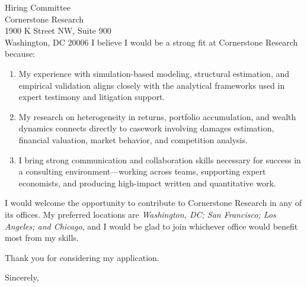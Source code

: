 \documentclass[11pt,letterpaper]{letter}
\begin{document}
\begin{letter}{Hiring Committee \\
Cornerstone Research \\
1900 K Street NW, Suite 900 \\
Washington, DC 20006}
I believe I would be a strong fit at Cornerstone Research because:
\begin{enumerate}
    \item My experience with simulation-based modeling, structural estimation, and empirical validation aligns closely with the analytical frameworks used in expert testimony and litigation support.
    \item My research on heterogeneity in returns, portfolio accumulation, and wealth dynamics connects directly to casework involving damages estimation, financial valuation, market behavior, and competition analysis.
    \item I bring strong communication and collaboration skills necessary for success in a consulting environment—working across teams, supporting expert economists, and producing high-impact written and quantitative work.
\end{enumerate}

I would welcome the opportunity to contribute to Cornerstone Research in any of its offices. My preferred locations are \textit{Washington, DC; San Francisco; Los Angeles; and Chicago}, and I would be glad to join whichever office would benefit most from my skills.

Thank you for considering my application.

\closing{Sincerely,}

\end{letter}
\end{document}
